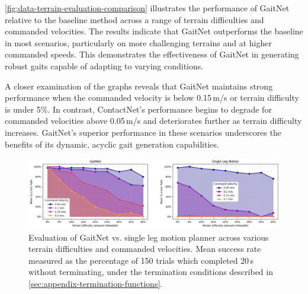 \autoref{fig:data-terrain-evaluation-comparison} illustrates the
performance of GaitNet relative to the baseline method across a range
of terrain difficulties and commanded velocities. The results
indicate that GaitNet outperforms the baseline in most scenarios,
particularly on more challenging terrains and at higher commanded
speeds. This demonstrates the effectiveness of GaitNet in generating
robust gaits capable of adapting to varying conditions.

A closer examination of the graphs reveals that GaitNet maintains
strong performance when the commanded velocity is below 0.15\,m/s or
terrain difficulty is under 5\%. In contrast, ContactNet's
performance begins to degrade for commanded velocities above
0.05\,m/s and deteriorates further as terrain difficulty increases.
GaitNet's superior performance in these scenarios underscores the
benefits of its dynamic, acyclic gait generation capabilities.

\begin{figure}[H]
  \centering
  \includegraphics[width=\textwidth]{images/data/terrain-evaluation-comparison.png}
  \caption{Evaluation of GaitNet vs. single leg motion planner
    across various terrain difficulties and commanded velocities.
    Mean success rate measured as the percentage of 150 trials
    which completed 20\,s without terminating, under the termination
  conditions described in \autoref{sec:appendix-termination-functions}.}
  \label{fig:data-terrain-evaluation-comparison}
\end{figure}
